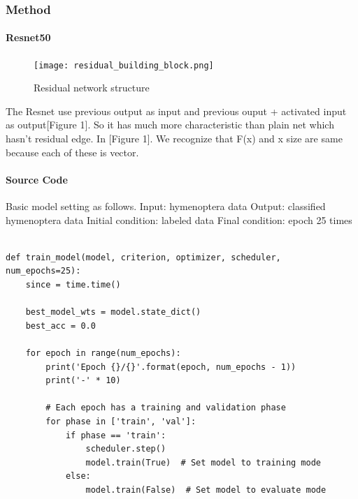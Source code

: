 \documentclass{article}
\begin{document}
\begin{CJK}{UTF8}{}
\subsubsection{Method}
\paragraph{Resnet50}
\newline
\newline
 
\begin{figure}[h!]
\centering
\texttt{[image: residual\_building\_block.png]}
\caption{Residual network structure}
\label{fig:resnet}
\end{figure}
 
The Resnet use previous output as input and previous ouput + activated input as output[Figure 1]. So it has much more characteristic than plain net which hasn't residual edge. In [Figure 1]. We recognize that F(x) and x size are same because each of these is vector.\newline

\paragraph{Source Code}
\newline
 \newline Basic model setting as follows.\newline
Input: hymenoptera data\newline
Output: classified hymenoptera data\newline
Initial condition: labeled data\newline
Final condition: epoch 25 times\newline
\begin{verbatim}
               
def train_model(model, criterion, optimizer, scheduler, num_epochs=25):
    since = time.time()

    best_model_wts = model.state_dict()
    best_acc = 0.0

    for epoch in range(num_epochs):
        print('Epoch {}/{}'.format(epoch, num_epochs - 1))
        print('-' * 10)

        # Each epoch has a training and validation phase
        for phase in ['train', 'val']:
            if phase == 'train':
                scheduler.step()
                model.train(True)  # Set model to training mode
            else:
                model.train(False)  # Set model to evaluate mode


\end{verbatim}
\end{CJK}
\end{document}
